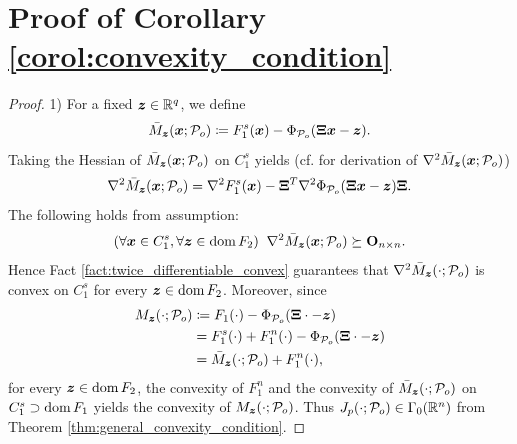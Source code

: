 \documentclass[lettersize,journal]{IEEEtran}
\theoremstyle{plain}%
\theoremstyle{definition}
\theoremstyle{remark}
\begin{document}
\section{Proof of Corollary \ref{corol:convexity_condition}}
\label{app:specific_convexity_condition}
\begin{proof}
1) For a fixed $\bm{z}\in\mathbb{R}^q$, we define
\begin{equation*}
\bar{M}_{\bm{z}}(\bm{x};\mathcal{P}_o)\coloneqq F_{1}^s(\bm{x})-\Phi_{\mathcal{P}_o}(\bm{\Xi} \bm{x}-\bm{z}).
\end{equation*}
Taking the Hessian of $\bar{M}_{\bm{z}}(\bm{x};\mathcal{P}_o)$ on $C_1^s$ yields (cf. \cite[A.4.4]{boyd2004} for derivation of $\nabla^2  \bar{M}_{\bm{z}}(\bm{x};\mathcal{P}_o)$)
\begin{equation*}
\nabla^2 \bar{M}_{\bm{z}}(\bm{x};\mathcal{P}_o)=\nabla^2 F_{1}^s(\bm{x})-\bm{\Xi}^T\nabla^2 \Phi_{\mathcal{P}_o}(\bm{\Xi} \bm{x}-\bm{z})\bm{\Xi}.
\end{equation*}
The following holds from assumption:
\begin{equation*}
(\forall \bm{x}\in C_1^s,\forall \bm{z}\in\textrm{dom\,}{F_2})\;\; \nabla^2 \bar{M}_{\bm{z}}(\bm{x};\mathcal{P}_o)\succeq \mathbf{O}_{n\times n}.
\end{equation*}
Hence Fact \ref{fact:twice_differentiable_convex} guarantees that $
\nabla^2 \bar{M}_{\bm{z}}(\cdot;\mathcal{P}_o)$ is convex on $C_1^s$ for every $\bm{z}\in\textrm{dom\,}{F_2}$. Moreover, since
\begin{align*}
M_{\bm{z}}(\cdot;\mathcal{P}_o) &\coloneqq F_1(\cdot)-\Phi_{\mathcal{P}_o}(\bm{\Xi}\cdot-\bm{z})\\
&=F_1^s(\cdot)+F_1^n(\cdot)-\Phi_{\mathcal{P}_o}(\bm{\Xi}\cdot-\bm{z})  \\
&=\bar{M}_{\bm{z}}(\cdot;\mathcal{P}_o)+F_1^n(\cdot),
\end{align*}
for every $\bm{z}\in\textrm{dom\,}{F_2}$, the convexity of $F_1^n$ and the convexity of $\bar{M}_{\bm{z}}(\cdot;\mathcal{P}_o)$ on $C_1^s\supset\textrm{dom\,}{F_1}$ yields the convexity of $M_{\bm{z}}(\cdot;\mathcal{P}_o)$. Thus $J_{p}(\cdot;\mathcal{P}_o)\in\Gamma_0(\mathbb{R}^n)$ from Theorem \ref{thm:general_convexity_condition}. 


\end{proof}
\end{document}
